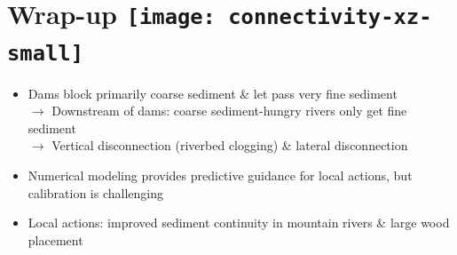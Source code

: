 \section{Wrap-up {\texttt{[image: connectivity-xz-small]}}}

{
%
\begin{frame}[plain]{}{\secname}
	\vspace{2.cm}
		\begin{tcolorbox}[colbacktitle=hellblau!80!black, colback=hellblau!10!white, fonttitle=\bfseries, standard jigsaw,colframe=blue_light, bottom=0mm, middle=0mm, boxsep=0.2mm, opacityframe=0.5, opacityfill=0.65, opacitybacktitle=0.75, title filled, title={\faGraduationCap\ Conclusions}, size=fbox]
			\vspace{0.25cm}
			\begin{itemize}			
				\item[\faChainBroken] Dams block primarily coarse sediment \& let pass very fine sediment\\
				$\rightarrow$ Downstream of dams: coarse sediment-hungry rivers only get fine sediment\\
				$\rightarrow$ Vertical disconnection (riverbed clogging) \& lateral disconnection \vspace{0.1cm}
				\item[\faLightbulbO] Numerical modeling provides predictive guidance for local actions, but calibration is challenging
				\item[\faLightbulbO] Local actions: improved sediment continuity in mountain rivers \& large wood placement
			\end{itemize}
			\vspace{0.1cm}
		\end{tcolorbox}
		\smallskip
\end{frame}
}

